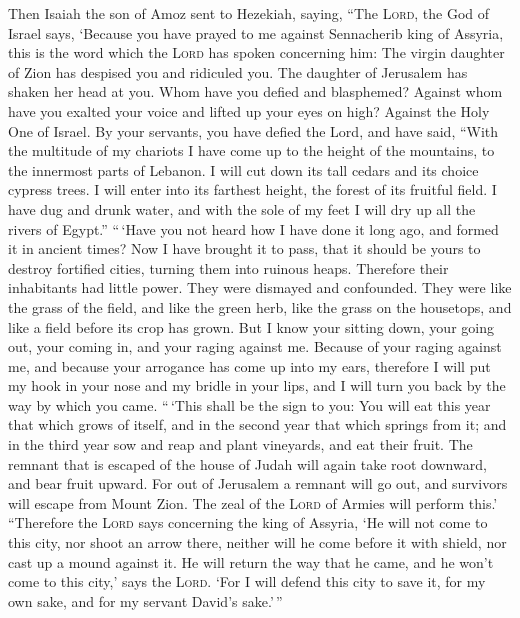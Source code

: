  Then Isaiah the son of Amoz sent to Hezekiah, saying,
``The \textsc{Lord}, the God of Israel says, `Because you have prayed to
me against Sennacherib king of Assyria,  this is the word
which the \textsc{Lord} has spoken concerning him: The virgin daughter
of Zion has despised you and ridiculed you. The daughter of Jerusalem
has shaken her head at you.  Whom have you defied and
blasphemed? Against whom have you exalted your voice and lifted up your
eyes on high? Against the Holy One of Israel.  By your
servants, you have defied the Lord, and have said, ``With the multitude
of my chariots I have come up to the height of the mountains, to the
innermost parts of Lebanon. I will cut down its tall cedars and its
choice cypress trees. I will enter into its farthest height, the forest
of its fruitful field.  I have dug and drunk water, and
with the sole of my feet I will dry up all the rivers of Egypt.''
 ``\,`Have you not heard how I have done it long ago, and
formed it in ancient times? Now I have brought it to pass, that it
should be yours to destroy fortified cities, turning them into ruinous
heaps.  Therefore their inhabitants had little power.
They were dismayed and confounded. They were like the grass of the
field, and like the green herb, like the grass on the housetops, and
like a field before its crop has grown.  But I know your
sitting down, your going out, your coming in, and your raging against
me.  Because of your raging against me, and because your
arrogance has come up into my ears, therefore I will put my hook in your
nose and my bridle in your lips, and I will turn you back by the way by
which you came.  ``\,`This shall be the sign to you: You
will eat this year that which grows of itself, and in the second year
that which springs from it; and in the third year sow and reap and plant
vineyards, and eat their fruit.  The remnant that is
escaped of the house of Judah will again take root downward, and bear
fruit upward.  For out of Jerusalem a remnant will go
out, and survivors will escape from Mount Zion. The zeal of the
\textsc{Lord} of Armies will perform this.'  ``Therefore
the \textsc{Lord} says concerning the king of Assyria, `He will not come
to this city, nor shoot an arrow there, neither will he come before it
with shield, nor cast up a mound against it.  He will
return the way that he came, and he won't come to this city,' says the
\textsc{Lord}.  `For I will defend this city to save it,
for my own sake, and for my servant David's sake.'\,''

